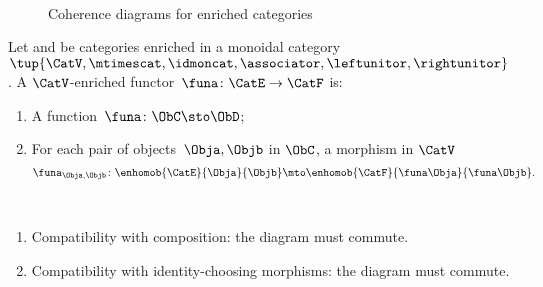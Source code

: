 \begin{figure*}[h!]
    \\
    \caption{Coherence diagrams for enriched categories}
    \label{fig:diagrams-enriched-category}
\end{figure*}



\begin{ctdefinition}
    \label{def:enrichedfunctor}

    Let \CatE and \CatF be categories enriched in a monoidal category $\tup{\CatV, \mtimescat, \idmoncat, \associator, \leftunitor, \rightunitor}$. A $\CatV$-enriched functor~$\funa\colon \CatE \to \CatF$ is:
    
    \constit
    \begin{enumerate}
        \item A function~$\funa\colon \ObC \sto \ObD$; 
        \item For each pair of objects~$\Obja, \Objb$ in $\ObC$, a morphism in $\CatV$
              \begin{equation}
                  \funa_{\Obja, \Objb} \colon \enhomob{\CatE}{\Obja}{\Objb} \mto \enhomob{\CatF}{\funa \Obja}{\funa \Objb}.
              \end{equation}
  \end{enumerate}
              
     \condit
      \begin{enumerate}
\item Compatibility with composition: the diagram
              must commute.
 \item Compatibility with identity-choosing morphisms: the diagram
             must commute.
\end{enumerate}
\end{ctdefinition}



